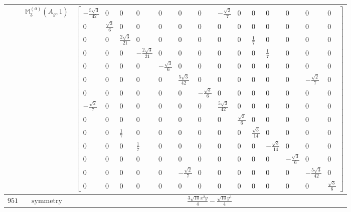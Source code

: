 \documentclass[fleqn,8pt,landscape]{jsarticle}
\begin{document}
\begin{longtable}{ccc}
$  $ & $ \mathbb{M}_{3}^{(a)}(A_{g},1) $ & $ \begin{bmatrix} - \frac{5 \sqrt{3}}{42} & 0 & 0 & 0 & 0 & 0 & 0 & - \frac{\sqrt{2}}{7} & 0 & 0 & 0 & 0 & 0 & 0 \\ 0 & \frac{\sqrt{3}}{6} & 0 & 0 & 0 & 0 & 0 & 0 & 0 & 0 & 0 & 0 & 0 & 0 \\ 0 & 0 & \frac{2 \sqrt{3}}{21} & 0 & 0 & 0 & 0 & 0 & 0 & \frac{1}{7} & 0 & 0 & 0 & 0 \\ 0 & 0 & 0 & - \frac{2 \sqrt{3}}{21} & 0 & 0 & 0 & 0 & 0 & 0 & \frac{1}{7} & 0 & 0 & 0 \\ 0 & 0 & 0 & 0 & - \frac{\sqrt{3}}{6} & 0 & 0 & 0 & 0 & 0 & 0 & 0 & 0 & 0 \\ 0 & 0 & 0 & 0 & 0 & \frac{5 \sqrt{3}}{42} & 0 & 0 & 0 & 0 & 0 & 0 & - \frac{\sqrt{2}}{7} & 0 \\ 0 & 0 & 0 & 0 & 0 & 0 & - \frac{\sqrt{3}}{6} & 0 & 0 & 0 & 0 & 0 & 0 & 0 \\ - \frac{\sqrt{2}}{7} & 0 & 0 & 0 & 0 & 0 & 0 & \frac{5 \sqrt{3}}{42} & 0 & 0 & 0 & 0 & 0 & 0 \\ 0 & 0 & 0 & 0 & 0 & 0 & 0 & 0 & \frac{\sqrt{3}}{6} & 0 & 0 & 0 & 0 & 0 \\ 0 & 0 & \frac{1}{7} & 0 & 0 & 0 & 0 & 0 & 0 & \frac{\sqrt{3}}{14} & 0 & 0 & 0 & 0 \\ 0 & 0 & 0 & \frac{1}{7} & 0 & 0 & 0 & 0 & 0 & 0 & - \frac{\sqrt{3}}{14} & 0 & 0 & 0 \\ 0 & 0 & 0 & 0 & 0 & 0 & 0 & 0 & 0 & 0 & 0 & - \frac{\sqrt{3}}{6} & 0 & 0 \\ 0 & 0 & 0 & 0 & 0 & - \frac{\sqrt{2}}{7} & 0 & 0 & 0 & 0 & 0 & 0 & - \frac{5 \sqrt{3}}{42} & 0 \\ 0 & 0 & 0 & 0 & 0 & 0 & 0 & 0 & 0 & 0 & 0 & 0 & 0 & \frac{\sqrt{3}}{6} \end{bmatrix} $ \\ \hline
$ 951 $ & $ \text{symmetry} $ & $ \frac{3 \sqrt{10} x^{2} y}{4} - \frac{\sqrt{10} y^{3}}{4} $ \\

\end{longtable}
\end{document}
